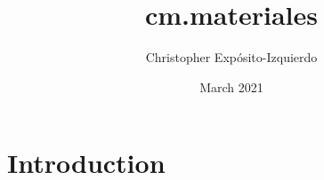 \documentclass{article}
\title{cm.materiales}
\author{Christopher Expósito-Izquierdo}
\date{March 2021}
\begin{document}
\maketitle

\section{Introduction}
\end{document}
